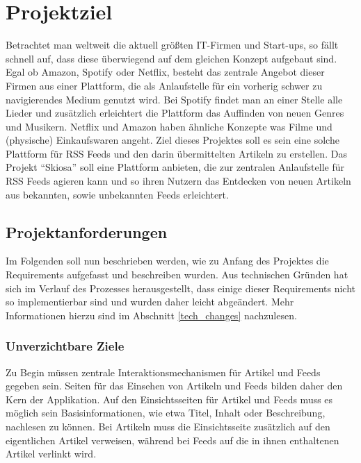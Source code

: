 
\chapter{Projektziel}

Betrachtet man weltweit die aktuell größten IT-Firmen und Start-ups, so fällt schnell auf, dass diese überwiegend auf dem gleichen Konzept aufgebaut sind.
Egal ob Amazon, Spotify oder Netflix, besteht das zentrale Angebot dieser Firmen aus einer Plattform, die als Anlaufstelle für ein vorherig schwer zu navigierendes Medium genutzt wird.
Bei Spotify findet man an einer Stelle alle Lieder und zusätzlich erleichtert die Plattform das Auffinden von neuen Genres und Musikern.
Netflix und Amazon haben ähnliche Konzepte was Filme und (physische) Einkaufswaren angeht.
Ziel dieses Projektes soll es sein eine solche Plattform für RSS Feeds und den darin übermittelten Artikeln zu erstellen.
Das Projekt \enquote{Skiosa} soll eine Plattform anbieten, die zur zentralen Anlaufstelle für RSS Feeds agieren kann und so ihren Nutzern das Entdecken von neuen Artikeln aus bekannten, sowie unbekannten Feeds erleichtert.

\section{Projektanforderungen}

Im Folgenden soll nun beschrieben werden, wie zu Anfang des Projektes die Requirements aufgefasst und beschreiben wurden.
Aus technischen Gründen hat sich im Verlauf des Prozesses herausgestellt, dass einige dieser Requirements nicht so implementierbar sind und wurden daher leicht abgeändert.
Mehr Informationen hierzu sind im Abschnitt \ref{tech_changes} nachzulesen.

\subsection{Unverzichtbare Ziele}
Zu Begin müssen zentrale Interaktionsmechanismen für Artikel und Feeds gegeben sein.
Seiten für das Einsehen von Artikeln und Feeds bilden daher den Kern der Applikation.
Auf den Einsichtsseiten für Artikel und Feeds muss es möglich sein Basisinformationen, wie etwa Titel, Inhalt oder Beschreibung, nachlesen zu können.
Bei Artikeln muss die Einsichtsseite zusätzlich auf den eigentlichen Artikel verweisen, während bei Feeds auf die in ihnen enthaltenen Artikel verlinkt wird.

